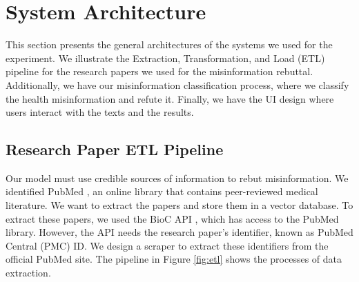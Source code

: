 



\chapter{System Architecture}

This section presents the general architectures of the systems we used for the experiment. We illustrate the Extraction, Transformation, and Load (ETL) pipeline for the research papers we used for the misinformation rebuttal. Additionally, we have our misinformation classification process, where we classify the health misinformation and refute it. Finally, we have the UI design where users interact with the texts and the results. 

\section{Research Paper ETL Pipeline}

Our model must use credible sources of information to rebut misinformation. We identified PubMed \cite{pubmed}, an online library that contains peer-reviewed medical literature. We want to extract the papers and store them in a vector database. To extract these papers, we used the BioC API \cite{bioinformatics}, which has access to the PubMed library. However, the API needs the research paper's identifier, known as PubMed Central (PMC) ID. We design a scraper to extract these identifiers from the official PubMed site. The pipeline in Figure \ref{fig:etl} shows the processes of data extraction. 

